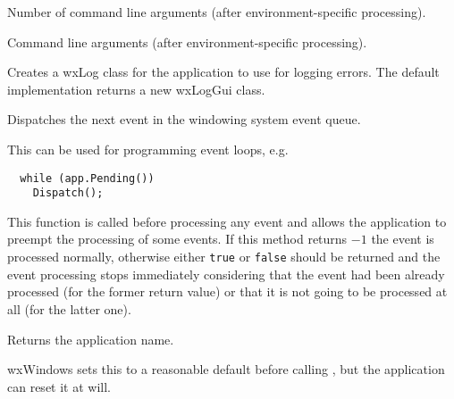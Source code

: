 Number of command line arguments (after environment-specific processing).


\label{wxappargv}


Command line arguments (after environment-specific processing).


\label{wxappcreatelogtarget}


Creates a wxLog class for the application to use for logging errors. The default
implementation returns a new wxLogGui class.




\label{wxappdispatch}


Dispatches the next event in the windowing system event queue.

This can be used for programming event loops, e.g.

\begin{verbatim}
  while (app.Pending())
    Dispatch();
\end{verbatim}




\label{wxappfilterevent}


This function is called before processing any event and allows the application
to preempt the processing of some events. If this method returns $-1$ the event
is processed normally, otherwise either {\tt true} or {\tt false} should be
returned and the event processing stops immediately considering that the event
had been already processed (for the former return value) or that it is not
going to be processed at all (for the latter one).


\label{wxappgetappname}


Returns the application name.


wxWindows sets this to a reasonable default before
calling , but the application can reset it at will.


